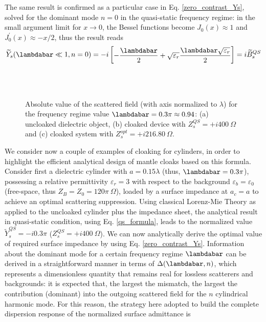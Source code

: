 \documentclass[reprint, showpacs, amsmath,amssymb, aps,
prb]{revtex4-1}
\begin{document}
The same result is confirmed as a particular case in Eq. \eqref{zero_contrast_Ys}, solved for the dominant mode $n=0$ in the quasi-static frequency regime: in the small argument limit for $x \rightarrow 0$, the Bessel functions become $J_0(x)\approx 1$ and $J^{'}_0(x)\approx -x/2$, thus the result reads
% 
\begin{align}
\widetilde{Y}_s (\lambdabar \ll 1, n=0)=-i\begin{bmatrix}
-\dfrac{\lambdabar}{2}+\sqrt{\varepsilon_r}\dfrac{\lambdabar \sqrt{\varepsilon_r}}{2}\end{bmatrix}=i\widetilde{B}_s^{QS}
\end{align}
%
%
\begin{figure}[ht!]
\centering
{}\\
\\
\caption{\small Absolute value of the scattered field (with axis normalized to $\lambda$) for the frequency regime value $\lambdabar=0.3\pi\approx 0.94$:  (a) uncloaked dielectric object, (b) cloaked device with $Z_s^{QS}=+i 400\ \Omega$ and  (c) cloaked system with $Z_s^{opt}=+i 216.80\ \Omega$.}
\label{fig:escat}
\end{figure}
%
We consider now a couple of examples of cloaking for cylinders, in order to highlight the efficient analytical design of mantle cloaks based on this formula. Consider first a dielectric cylinder with $a=0.15\lambda$ (thus, $\lambdabar=0.3 \pi$),  possessing a relative permittivity $\varepsilon_r=3$ with respect to the background $\varepsilon_b=\varepsilon_0$ (free-space, thus $Z_B=Z_0=120\pi\ \Omega$), loaded by a surface impedance at $a_c=a$ to achieve an optimal scattering suppression. Using classical Lorenz-Mie Theory as applied to the uncloaked cylinder plus the impedance sheet, the analytical result in quasi-static condition, using Eq.  \eqref{qs_formula}, leads to the normalized value $\widetilde{Y}_s^{QS}=-i 0.3\pi$ ($Z_s^{QS}=+i400\ \Omega$). We can now analytically derive the optimal value of required surface impedance by using Eq. \eqref{zero_contrast_Ys}. Information about the dominant mode for a certain frequency regime $\lambdabar$ can be derived in a straightforward manner in terms of $\Delta(\lambdabar,n)$, which represents a dimensionless quantity that remains real for lossless scatterers and backgrounds: it is expected that, the largest the mismatch, the largest the contribution (dominant) into the outgoing scattered field for the $n$ cylindrical harmonic mode. For this reason, the strategy here adopted to build the complete dispersion response of the normalized surface admittance is
\end{document}

